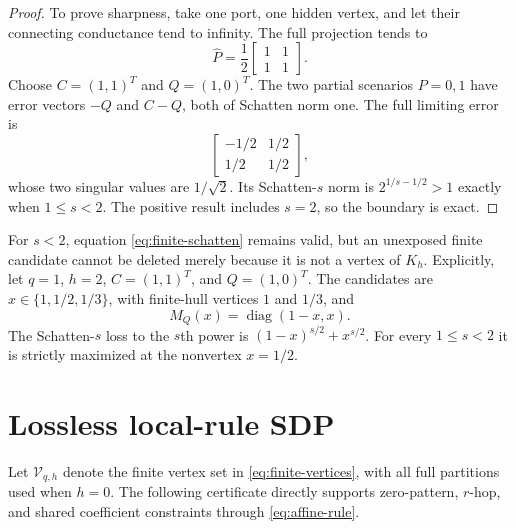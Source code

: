 \documentclass[journal,10pt]{IEEEtran}
\theoremstyle{definition}
\theoremstyle{remark}
\newcommand{\diag}{\operatorname{diag}}
\begin{document}
\begin{proof}
To prove sharpness, take one port, one hidden vertex, and let their connecting
conductance tend to infinity.  The full projection tends to
\[
  \widehat P=\frac12\begin{bmatrix}1&1\\1&1\end{bmatrix}.
\]
Choose
$C=(1,1)^T$ and $Q=(1,0)^T$.  The two partial scenarios $P=0,1$ have error
vectors $-Q$ and $C-Q$, both of Schatten norm one.  The full limiting error is
\[
  \begin{bmatrix}-1/2&1/2\\1/2&1/2\end{bmatrix},
\]
whose two singular values are $1/\sqrt2$.  Its Schatten-$s$ norm is
$2^{1/s-1/2}>1$ exactly when $1\leq s<2$.  The positive result includes
$s=2$, so the boundary is exact.
\end{proof}

For $s<2$, equation \eqref{eq:finite-schatten} remains valid, but an
unexposed finite candidate cannot be deleted merely because it is not a
vertex of $K_h$.  Explicitly, let $q=1$, $h=2$,
$C=(1,1)^T$, and $Q=(1,0)^T$.  The candidates are
$x\in\{1,1/2,1/3\}$, with finite-hull vertices $1$ and $1/3$, and
\[
 M_Q(x)=\diag(1-x,x).
\]
The Schatten-$s$ loss to the $s$th power is
$(1-x)^{s/2}+x^{s/2}$.  For every $1\le s<2$ it is strictly maximized at the
nonvertex $x=1/2$.

\section{Lossless local-rule SDP}

Let $\mathcal V_{q,h}$ denote the finite vertex set in
\eqref{eq:finite-vertices}, with all full partitions used when $h=0$.  The
following certificate directly supports zero-pattern, $r$-hop, and shared
coefficient constraints through \eqref{eq:affine-rule}.
\end{document}
